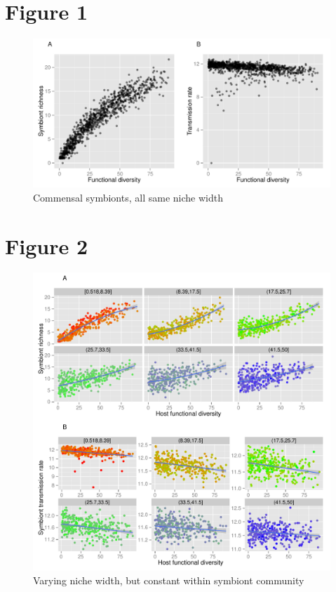 \documentclass[12pt]{article}
\begin{document}
\newpage

\section*{Figure 1}

\begin{figure}[ht]\centering
\includegraphics[width=\linewidth]{fig/fig1.pdf}
\caption{Commensal symbionts, all same niche width}
\label{fig:fig/fig1}
\end{figure}

\newpage

\section*{Figure 2}

\begin{figure}[ht]\centering
\includegraphics[width=\linewidth]{fig/fig2.pdf}
\caption{Varying niche width, but constant within symbiont community}
\label{fig:fig2}
\end{figure}
\end{document}
